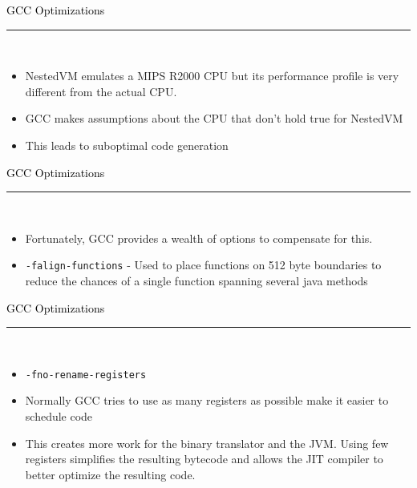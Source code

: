 \documentclass[letter]{seminar}
\begin{document}
\begin{slide}\raggedright
\renewcommand{\leftmargini}{5mm}
{\Large{\textcolor{black}{GCC Optimizations}}}
\\\rule{\textwidth}{0.1pt}\\

\begin{itemize}


\item
     NestedVM emulates a MIPS R2000 CPU but its performance profile 
      is very different from the actual CPU.

\item
     GCC makes assumptions about the CPU that don't hold true for 
      NestedVM

\item
     This leads to suboptimal code generation


\end{itemize}


\end{slide}


\begin{slide}\raggedright
\renewcommand{\leftmargini}{5mm}
{\Large{\textcolor{black}{GCC Optimizations}}}
\\\rule{\textwidth}{0.1pt}\\

\begin{itemize}


\item
     Fortunately, GCC provides a wealth of options to compensate for 
      this.

\item
     {\texttt{-falign-functions}} - Used to place functions on 512 byte boundaries to 
      reduce the chances of a single function spanning several java 
      methods


\end{itemize}


\end{slide}


\begin{slide}\raggedright
\renewcommand{\leftmargini}{5mm}
{\Large{\textcolor{black}{GCC Optimizations}}}
\\\rule{\textwidth}{0.1pt}\\

\begin{itemize}


\item
     {\texttt{-fno-rename-registers}}

\item
     Normally GCC tries to use as many registers as possible make it easier to 
      schedule code

\item
     This creates more work for the binary translator and the JVM. Using few 
      registers simplifies the resulting bytecode and allows the JIT compiler to 
      better optimize the resulting code.


\end{itemize}


\end{slide}
\end{document}
